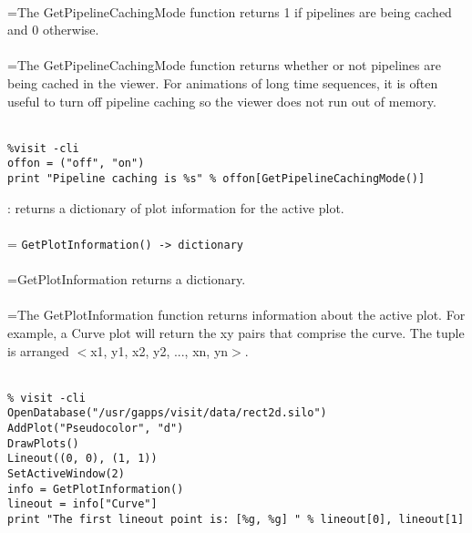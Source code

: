 \documentclass[10pt,a4paper]{report}
\begin{document}
 \\ 
\hangindent=\parindent The GetPipelineCachingMode function returns 1 if pipelines are being cached and 0 otherwise. \\[-3mm] 

 \\ 
\hangindent=\parindent The GetPipelineCachingMode function returns whether or not pipelines are being cached in the viewer. For animations of long time sequences, it is often useful to turn off pipeline caching so the viewer does not run out of memory. \\[-3mm] 

\\[-6mm]
\begin{verbatim}%visit -cli
offon = ("off", "on")
print "Pipeline caching is %s" % offon[GetPipelineCachingMode()]
\end{verbatim}
\newpage


{}
: returns a dictionary of plot information for the active plot.\\[-3mm]

 \\ 
\hangindent=\parindent 
\verb!GetPlotInformation() -> dictionary!\\ [-3mm]

 \\ 
\hangindent=\parindent GetPlotInformation returns a dictionary. \\[-3mm] 

 \\ 
\hangindent=\parindent The GetPlotInformation function returns information about the active plot. For example, a Curve plot will return the xy pairs that comprise the  curve.  The tuple is arranged $<$x1, y1, x2, y2, ..., xn, yn$>$. \\[-3mm] 

\\[-6mm]
\begin{verbatim}% visit -cli
OpenDatabase("/usr/gapps/visit/data/rect2d.silo")
AddPlot("Pseudocolor", "d")
DrawPlots()
Lineout((0, 0), (1, 1))
SetActiveWindow(2)
info = GetPlotInformation()
lineout = info["Curve"]
print "The first lineout point is: [%g, %g] " % lineout[0], lineout[1]
\end{verbatim}
\newpage
\end{document}
